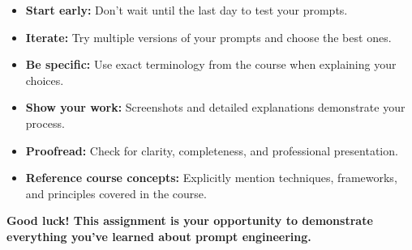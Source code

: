 \documentclass[11pt]{article}
\begin{document}
\begin{itemize}
    \item \textbf{Start early:} Don't wait until the last day to test your prompts.
    \item \textbf{Iterate:} Try multiple versions of your prompts and choose the best ones.
    \item \textbf{Be specific:} Use exact terminology from the course when explaining your choices.
    \item \textbf{Show your work:} Screenshots and detailed explanations demonstrate your process.
    \item \textbf{Proofread:} Check for clarity, completeness, and professional presentation.
    \item \textbf{Reference course concepts:} Explicitly mention techniques, frameworks, and principles covered in the course.
\end{itemize}

\vspace{1cm}

\vspace{0.5cm}

\noindent\textbf{Good luck! This assignment is your opportunity to demonstrate everything you've learned about prompt engineering.}
\end{document}
